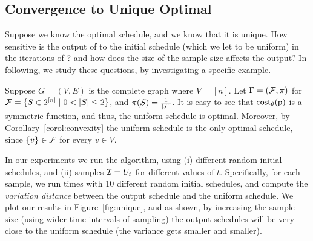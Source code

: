 % 
% 

\subsection{Convergence to Unique Optimal}
Suppose we know the optimal schedule, and we know that it is unique. How sensitive is the output of \algonameapx to the initial schedule (which we let to be uniform) in the iterations of \algonameapx? and how does the size of the sample size affects the output? In following, we study these questions, by investigating a specific example.

Suppose $G=(V,E)$ is the complete graph where $V=[n]$. Let $\Gamma=(\mathcal{F}, \pi)$ for  $\family = \{S \in 2^{[n]} \mid 0 <|S| \leq 2\}$, and $\pi(S)=\frac{1}{|\mathcal{F}|}$. It is easy to see that $\mathsf{cost}_\theta(\mathsf{p})$ is a symmetric function, and thus, the uniform schedule is optimal. Moreover, by Corollary~\ref{corol:convexity} the uniform schedule is the only optimal schedule, since $\{v\} \in \mathcal{F}$ for every $v\in V$.

In our experiments we run the \algonameapx algorithm, using (i) different random initial schedules, and (ii) samples $\mathcal{I}=U_t$ for different values of $t$. Specifically, for each sample, we run  times with 10 different random initial schedules, and compute the \emph{variation distance} between the output schedule and the uniform schedule. We plot our results in Figure~\ref{fig:unique}, and as shown, by increasing the sample size (using wider time intervals of sampling) the output schedules will be very close to the uniform schedule (the variance gets smaller and smaller).

